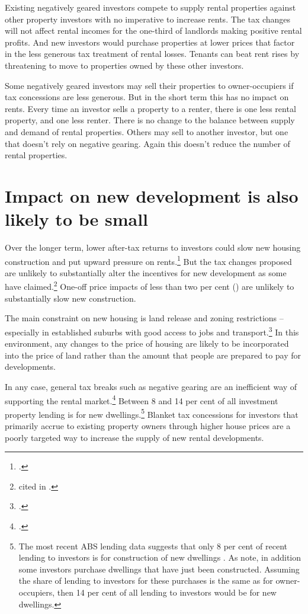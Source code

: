 \documentclass{grattanAlpha}\usepackage[]{graphicx}\usepackage[]{color}
\begin{document}
Existing negatively geared investors compete to supply rental properties against other property investors with no imperative to increase rents. The tax changes will not affect rental incomes for the one-third of landlords making positive rental profits. And new investors would purchase properties at lower prices that factor in the less generous tax treatment of rental losses. Tenants can beat rent rises by threatening to move to properties owned by these other investors. 

Some negatively geared investors may sell their properties to owner-occupiers if tax concessions are less generous. But in the short term this has no impact on rents.  Every time an investor sells a property to a renter, there is one less rental property, and one less renter. There is no change to the balance between supply and demand of rental properties. Others may sell to another investor, but one that doesn’t rely on negative gearing. Again this doesn’t reduce the number of rental properties. 

\section{Impact on new development is also likely to be small}\label{sec:Impact-new-development}
Over the longer term, lower after-tax returns to investors could slow new housing construction and put upward pressure on rents.\footcites{Poterba1984}{AlmFollain1994} But the tax changes proposed are unlikely to substantially alter the incentives for new development as some have claimed.\footnote{\textcite{BISShrapnel2016} cited in \textcite{Daley2016onBIS}.} One-off price impacts of less than two per cent () are unlikely to substantially slow new construction.

The main constraint on new housing is land release and zoning restrictions – especially in established suburbs with good access to jobs and transport.\footcites{KellyHarrisonHunterEtAl2013}[][84--90]{KellyDonegan2015} In this environment, any changes to the price of housing are likely to be incorporated into the price of land rather than the amount that people are prepared to pay for developments. 

In any case, general tax breaks such as negative gearing are an inefficient way of supporting the rental market.\footcite{HenryTaxReview2010} Between 8 and 14 per cent of all investment property lending is for new dwellings.\footnote{The most recent ABS lending data suggests that only 8 per cent of recent lending to investors is for construction of new dwellings \textcite{ABS2016}. As \textcite{StapledonRoberts2016} note, in addition some investors purchase dwellings that have just been constructed. Assuming the share of lending to investors for these purchases is the same as for owner-occupiers, then 14 per cent of all lending to investors would be for new dwellings.}   Blanket tax concessions for investors that primarily accrue to existing property owners through higher house prices are a poorly targeted way to increase the supply of new rental developments.
\end{document}
